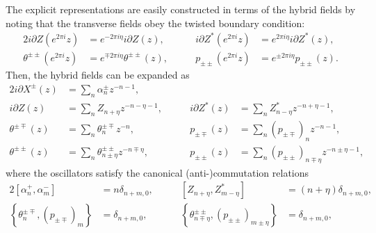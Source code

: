 \documentclass[a4paper,seceq,preprint]{ptptex}
\begin{document}
The explicit representations are easily constructed in terms of 
the hybrid fields by noting that
the transverse fields \coordHE{}
obey the twisted boundary condition:
\begin{alignat}{2}
   i\partial Z(e^{2\pi i}z)&=e^{-2\pi i\eta}i\partial Z(z),&\qquad
   i\partial Z^*(e^{2\pi i}z)&=e^{2\pi i\eta}i\partial Z^*(z),
\nonumber\\
   \theta^{\pm\pm}(e^{2\pi i}z)&=e^{\mp 2\pi i\eta}\theta^{\pm\pm}(z),
&\qquad
   p_{\pm\pm}(e^{2\pi i}z)&=e^{\pm 2\pi i\eta}p_{\pm\pm}(z).
\label{twstbc}
\end{alignat}
Then, the hybrid fields can be expanded as
\begin{alignat}{2}
   i\partial X^\pm(z)&=\sum_n\alpha^\pm_nz^{-n-1},&&\nonumber\\
  i\partial Z(z)&=\sum_nZ_{n+\eta}z^{-n-\eta-1},&\qquad
  i\partial Z^*(z)&=\sum_nZ^*_{n-\eta}z^{-n+\eta-1},
\nonumber\\
  \theta^{\pm\mp}(z)&=\sum_n\theta^{\pm\mp}_nz^{-n},&\qquad
  p_{\pm\mp}(z)&=\sum_n(p_{\pm\mp})_nz^{-n-1},\nonumber\\
  \theta^{\pm\pm}(z)&=\sum_n\theta^{\pm\pm}_{n\pm\eta}z^{-n\mp\eta},
&\qquad
  p_{\pm\pm}(z)&=\sum_n(p_{\pm\pm})_{n\mp\eta}z^{-n\pm\eta-1},
\label{ffr}
\end{alignat}
where the oscillators satisfy the canonical 
(anti-)commutation relations
\begin{alignat}{2}
  \left[\alpha^+_n,\alpha^-_m\right]&=n\delta_{n+m,0},&\qquad
  \left[Z_{n+\eta},Z^*_{m-\eta}\right]&=(n+\eta)\delta_{n+m,0},
\nonumber\\
  \left\{\theta^{\pm\mp}_n,(p_{\pm\mp})_m\right\}&=\delta_{n+m,0},&\qquad
  \left\{\theta^{\pm\pm}_{n\mp\eta},(p_{\pm\pm})_{m\pm\eta}\right\}&
=\delta_{n+m,0},
\label{oscccr}
\end{alignat}
\end{document}
